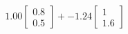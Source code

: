 \documentclass[preview]{standalone}
\begin{document}
\begin{align*}
1.00 \begin{bmatrix} 0.8 \\ 0.5 \end{bmatrix} + -1.24 \begin{bmatrix} 1 \\ 1.6 \end{bmatrix}
\end{align*}
\end{document}
